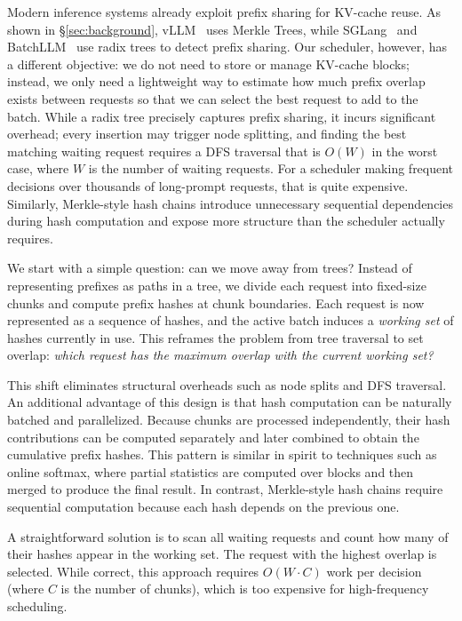 Modern inference systems already exploit prefix sharing for KV-cache reuse. As shown in \S\ref{sec:background}, vLLM~\cite{kwon2023efficient} uses Merkle Trees, while SGLang~\cite{zheng2024sglangefficientexecutionstructured} and BatchLLM~\cite{zheng2025batchllmoptimizinglargebatched} use radix trees to detect prefix sharing. Our scheduler, however, has a different objective: we do not need to store or manage KV-cache blocks; instead, we only need a lightweight way to estimate how much prefix overlap exists between requests so that we can select the best request to add to the batch. While a radix tree precisely captures prefix sharing, it incurs significant overhead; every insertion may trigger node splitting, and finding the best matching waiting request requires a DFS traversal that is $O(W)$ in the worst case, where $W$ is the number of waiting requests. For a scheduler making frequent decisions over thousands of long-prompt requests, that is quite expensive. Similarly, Merkle-style hash chains introduce unnecessary sequential dependencies during hash computation and expose more structure than the scheduler actually requires.

We start with a simple question: can we move away from trees? Instead of representing prefixes as paths in a tree, we divide each request into fixed-size chunks and compute prefix hashes at chunk boundaries. Each request is now represented as a sequence of hashes, and the active batch induces a \emph{working set} of hashes currently in use. This reframes the problem from tree traversal to set overlap: \emph{which request has the maximum overlap with the current working set?}

This shift eliminates structural overheads such as node splits and DFS traversal. An additional advantage of this design is that hash computation can be naturally batched and parallelized. Because chunks are processed independently, their hash contributions can be computed separately and later combined to obtain the cumulative prefix hashes. This pattern is similar in spirit to techniques such as online softmax, where partial statistics are computed over blocks and then merged to produce the final result. In contrast, Merkle-style hash chains require sequential computation because each hash depends on the previous one.

A straightforward solution is to scan all waiting requests and count how many of their hashes appear in the working set. The request with the highest overlap is selected. While correct, this approach requires $O(W \cdot C)$ work per decision (where $C$ is the number of chunks), which is too expensive for high-frequency scheduling.

